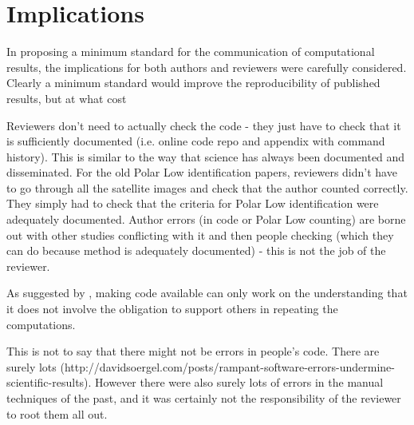 \section{Implications}

In proposing a minimum standard for the communication of computational results, the implications for both authors and reviewers were carefully considered. Clearly a minimum standard would improve the reproducibility of published results, but at what cost  

Reviewers don't need to actually check the code - they just have to check that it is sufficiently documented (i.e. online code repo and appendix with command history). This is similar to the way that science has always been documented and disseminated. For the old Polar Low identification papers, reviewers didn't have to go through all the satellite images and check that the author counted correctly. They simply had to check that the criteria for Polar Low identification were adequately documented. Author errors (in code or Polar Low counting) are borne out with other studies conflicting with it and then people checking (which they can do because method is adequately documented) - this is not the job of the reviewer.

As suggested by \citet{Easterbrook2014}, making code available can only work on the understanding that it does not involve the obligation to support others in repeating the computations.

This is not to say that there might not be errors in people's code. There are surely lots (http://davidsoergel.com/posts/rampant-software-errors-undermine-scientific-results). However there were also surely lots of errors in the manual techniques of the past, and it was certainly not the responsibility of the reviewer to root them all out.